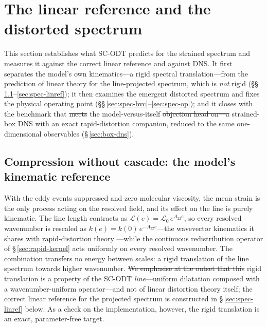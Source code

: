 \documentclass[lineno]{JFM-FLM_Au}
\providecommand{\DIFadd}[1]{{\protect\color{blue}\uwave{#1}}} %
\providecommand{\DIFdel}[1]{{\protect\color{red}\sout{#1}}} %
\providecommand{\DIFaddbegin}{} %
\providecommand{\DIFaddend}{} %
\providecommand{\DIFdelbegin}{} %
\providecommand{\DIFdelend}{} %
\begin{document}
\section{The linear reference and the distorted spectrum}\label{sec:val-spectrum}

This section establishes what SC-ODT predicts for the strained spectrum
and measures it against the correct linear reference and against DNS.
It first separates the model's own kinematics---a rigid spectral
translation---from the prediction of linear theory for the
line-projected spectrum, which is \emph{not} rigid
(\S\S\,\ref{sec:spec-rdt}--\ref{sec:spec-linref}); it then examines the
emergent distorted spectrum and fixes the physical operating point
(\S\S\,\ref{sec:spec-bvc}--\ref{sec:spec-op}); and it closes with the benchmark that \DIFdelbegin \DIFdel{meets }\DIFdelend \DIFaddbegin \DIFadd{addresses }\DIFaddend the model-versus-itself \DIFdelbegin \DIFdel{objection head on---a
}\DIFdelend \DIFaddbegin \DIFadd{comparison---a
}\DIFaddend strained-box DNS with an exact rapid-distortion companion, reduced to
the same one-dimensional observables (\S\,\ref{sec:box-dns}).

\subsection{Compression without cascade: the model's kinematic
reference}\label{sec:spec-rdt}

With the eddy events suppressed and zero molecular viscosity, the mean strain
is the only process acting on the resolved field, and its effect on the line
is purely kinematic. The line length contracts as
$\mathcal{L}(e)=\mathcal{L}_0\,e^{A_{22}e}$, so every resolved wavenumber is
rescaled as $k(e)=k(0)\,e^{-A_{22}e}$---the wavevector kinematics it shares
with rapid-distortion theory \citep{BatchelorProudman1954,HuntCarruthers1990}%
---while the continuous redistribution operator of
\S\,\ref{sec:rapid-kernel} acts uniformly on every resolved wavenumber. The
combination transfers no energy between scales: a rigid translation of the
line spectrum towards higher wavenumber. \DIFdelbegin \DIFdel{We emphasise at the outset that this
}\DIFdelend \DIFaddbegin \DIFadd{This }\DIFaddend rigid translation is a property of the SC-ODT \emph{line}---uniform
dilatation composed with a wavenumber-uniform operator---and not of linear
distortion theory itself; the correct linear reference for the projected
spectrum is constructed in \S\,\ref{sec:spec-linref} below. As a check on the
implementation, however, the rigid translation is an exact, parameter-free
target.
\end{document}

